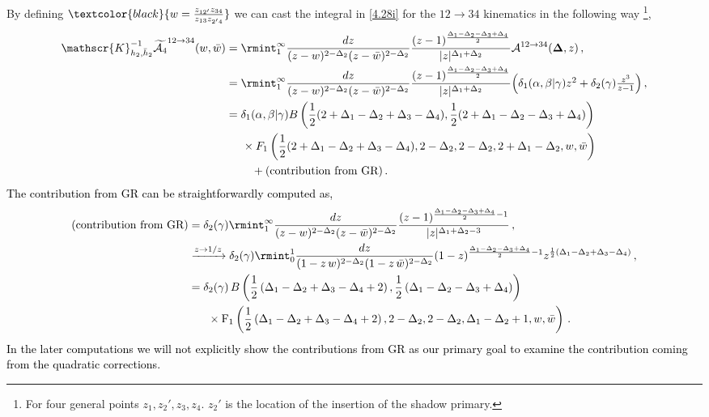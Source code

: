 By defining $\textcolor{black}{w=\frac{z_{12'}z_{34}}{z_{13}z_{2'4}}}$ we can cast the integral in \eqref{4.28i} for the $12\to 34$ kinematics in the following way \footnote{For four general points $z_1,z_2',z_3,z_4 $. $z_2'$ is the location of the insertion of the shadow primary.},
\begin{align}
    \begin{split}
    \mathscr{K}_{h_2,\bar h_2}^{-1}\widetilde{\mathcal{A}_{4}}^{12\to 34}(w,\bar w)&=\rmint_{1}^{\infty}\frac{dz}{(z-w)^{2-\Delta_2}(z-\bar w)^{2-\Delta_2}}\frac{(z-1)^{\frac{\Delta_1-\Delta_2-\Delta_3+\Delta_4}{2}}}{|z|^{\Delta_1+\Delta_2}}\mathcal{A}^{12\to 34}(\mathbf{\Delta},z)\,,\\ & =\rmint_{1}^{\infty}\frac{dz}{(z-w)^{2-\Delta_2}(z-\bar w)^{2-\Delta_2}}\frac{(z-1)^{\frac{\Delta_1-\Delta_2-\Delta_3+\Delta_4}{2}}}{|z|^{\Delta_1+\Delta_2}}\textstyle{\left(\delta_{1}(\alpha,\beta|\gamma)z^2+\delta_2(\gamma)\frac{z^3}{z-1}\right)}\,, \\ & =\delta_1(\alpha,\beta|\gamma)B\left(\frac{1}{2}(2+\Delta_1-\Delta_2+\Delta_3-\Delta_4),\frac{1}{2}(2+\Delta_1-\Delta_2-\Delta_3+\Delta_4)\right)\\ &\hspace{0.5 cm}\times F_{1}\left(\frac{1}{2}(2+\Delta_1-\Delta_2+\Delta_3-\Delta_4),2-\Delta_2,2-\Delta_2,2+\Delta_1-\Delta_2,w,\bar w\right)\\&\hspace{0.8cm}+(\textrm{contribution from GR})\,.
    \end{split}
\end{align}
\textcolor{black}{
The contribution from GR can be straightforwardly computed as,
\begingroup\tiny
\begin{align}
    \begin{split}
        (\textrm{contribution from GR})&=\delta_2(\gamma)\rmint_{1}^{\infty}\frac{dz}{(z-w)^{2-\Delta_2}(z-\bar w)^{2-\Delta_2}}\frac{(z-1)^{\frac{\Delta_1-\Delta_2-\Delta_3+\Delta_4}{2}-1}}{|z|^{\Delta_1+\Delta_2-3}}\,, \\ &
        \xrightarrow[]{z \to 1/z} \delta_2(\gamma)\rmint_0^1 \frac{dz}{(1-z\,w)^{2-\Delta_2}(1-z\,\bar{w})^{2-\Delta_2}} (1-z)^{\frac{\Delta_1-\Delta_2-\Delta_3+\Delta_4}{2}-1}z^{\frac{1}{2} \left(\Delta _1-\Delta _2+\Delta _3-\Delta _4\right)}\,,\\ &
        =\delta_2(\gamma)\,B\left(\frac{1}{2} \left(\Delta _1-\Delta _2+\Delta _3-\Delta _4+2\right),\frac{1}{2} \left(\Delta _1-\Delta _2-\Delta _3+\Delta _4\right)\right)\\&
        \hspace{0.6 cm}\times\textrm{F}_1\left(\frac{1}{2} \left(\Delta _1-\Delta _2+\Delta _3-\Delta _4+2\right),2-\Delta_2,2-\Delta_2,\Delta _1-\Delta _2+1,w,\bar w\right)\,.
    \end{split}
\end{align}
\endgroup
In the later computations we will not explicitly show the contributions from GR as our primary goal to examine the contribution coming from the quadratic corrections.}
